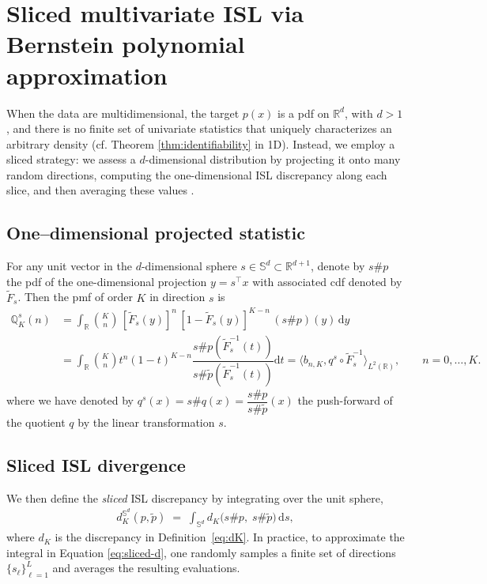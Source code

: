 \documentclass{article}
\begin{document}
\section{Sliced multivariate ISL via Bernstein polynomial approximation} \label{section:Sliced Multivariate ISL via Bernstein Polynomial Approximation}

When the data are multidimensional, the target $p(x)$ is a pdf on $\mathbb{R}^{d}$, with $d>1$, and there is no finite set of univariate statistics that uniquely characterizes an arbitrary density (cf. Theorem \ref{thm:identifiability} in 1D).  Instead, we employ a sliced strategy: we assess a $d$-dimensional distribution by projecting it onto many random directions, computing the one-dimensional ISL discrepancy along each slice, and then averaging these values \cite{de2024robust,kolouri2019generalized}.

\subsection*{One–dimensional projected statistic} 
For any unit vector in the $d$-dimensional sphere \(s\in\mathbb S^{d}\subset\mathbb{R}^{d+1}\), denote by $s\#p$ the pdf of the one-dimensional projection $y = s^\top x$ with associated cdf denoted by \(\tilde F_s\).  Then the pmf of order \(K\) in direction \(s\) is
\begin{align*}
\mathbb{Q}_K^s(n) &= \int_{\mathbb{R}} \binom{K}{n}\,[\tilde{F}_s(y)]^n\,[1-\tilde{F}_s(y)]^{K-n}\,(s\#p)(y)\,\mathrm{d}y \\&= \int_{\mathbb{R}}\binom{K}{n} t^{n} (1 - t)^{K-n} \dfrac{s\#p(\tilde{F}_{s}^{-1}(t))}{s\#\tilde{p}(\tilde{F}_{s}^{-1}(t))}\mathrm{d}t = \langle b_{n,K}, q^{s} \circ \tilde{F}_{s}^{-1}\rangle_{L^{2}(\mathbb{R})}, \qquad n=0,\ldots, K. 
\end{align*}
where we have denoted by $q^{s}(x) = s\#q(x) = \dfrac{s\#p}{s\#\tilde{p}}(x) $ the push-forward of the quotient $q$ by the linear transformation $s$.

\subsection*{Sliced ISL divergence}
We then define the \emph{sliced} ISL discrepancy by integrating over the unit sphere,
\begin{align}\label{eq:sliced-d}
d_{K}^{\mathbb S^d}(p,\tilde p)
\;=\;\int_{\mathbb S^d}
d_K\bigl(s\#p,\;s\#\tilde p\bigr)\,\mathrm{d}s,
\end{align}
where \(d_K\) is the discrepancy in Definition~\ref{eq:dK}. In practice, to approximate the integral in Equation \ref{eq:sliced-d}, one randomly samples a finite set of directions \(\{s_\ell\}_{\ell=1}^L\) and averages the resulting evaluations.
\end{document}
